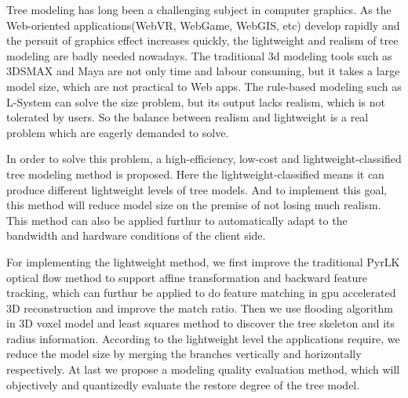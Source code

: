 \begin{eabstract}
Tree modeling has long been a challenging subject in computer graphics. As the Web-oriented applications(WebVR, WebGame,
WebGIS, etc) develop rapidly and the persuit of graphics effect increases quickly, the lightweight and realism of tree modeling are badly
needed nowadays. The traditional 3d modeling tools such as 3DSMAX and Maya are not only time and labour consuming, but it
takes a large model size, which are not practical to Web apps. The rule-based modeling such as L-System can solve the size
problem, but its output lacks realism, which is not tolerated by users. So the balance between realism and lightweight
is a real problem which are eagerly demanded to solve.

In order to solve this problem, a high-efficiency, low-cost and lightweight-classified tree modeling method is proposed.
Here the lightweight-classified means it can produce different lightweight levels of tree models. And to implement this 
goal, this method will reduce model size on the premise of not losing much realism. This method can also be applied furthur
to automatically adapt to the bandwidth and hardware conditions of the client side.

For implementing the lightweight method, we first improve the traditional PyrLK optical flow method to support affine transformation
and backward feature tracking, which can furthur be applied to do feature matching in gpu accelerated 3D reconstruction and 
improve the match ratio. Then we use flooding algorithm in 3D voxel model and least squares method to discover the tree skeleton and
its radius information. According to the lightweight level the applications require, we reduce the model size by merging the
branches vertically and horizontally respectively. At last we propose a modeling quality evaluation method, which will objectively and 
quantizedly evaluate the restore degree of the tree model.
\end{eabstract}

